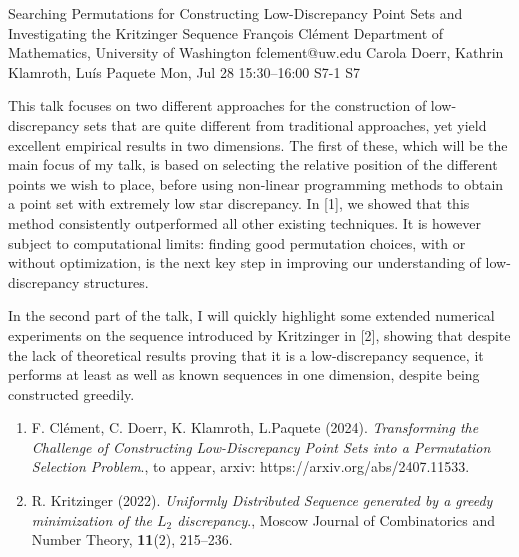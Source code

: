 \documentclass[12pt,lettersize,oneside]{book} %
\begin{document}
\begin{talk}
  {Searching Permutations for Constructing Low-Discrepancy Point Sets and Investigating the Kritzinger Sequence}%
  {Fran\c{c}ois Cl\'{e}ment}%
  {Department of Mathematics, University of Washington}%
  {fclement@uw.edu}%
  {Carola Doerr, Kathrin Klamroth, Lu\'is Paquete}%
  {}%
  {Mon, Jul 28 15:30--16:00}%
  {S7-1}%
  {S7}%
  
    
   
This talk focuses on two different approaches for the construction of low-discrepancy sets that are quite different from traditional approaches, yet yield excellent empirical results in two dimensions. The first of these, which will be the main focus of my talk, is based on selecting the relative position of the different points we wish to place, before using non-linear programming methods to obtain a point set with extremely low star discrepancy. In [1], we showed that this method consistently outperformed all other existing techniques. It is however subject to computational limits: finding good permutation choices, with or without optimization, is the next key step in improving our understanding of low-discrepancy structures.

In the second part of the talk, I will quickly highlight some extended numerical experiments on the sequence introduced by Kritzinger in [2], showing that despite the lack of theoretical results proving that it is a low-discrepancy sequence, it performs at least as well as known sequences in one dimension, despite being constructed greedily. 

\medskip

\begin{enumerate}
 \item[{[1]}] F. Cl\'ement, C. Doerr, K. Klamroth, L.Paquete (2024). {\it Transforming the Challenge of Constructing Low-Discrepancy Point Sets into a Permutation Selection Problem}., to appear, arxiv: https://arxiv.org/abs/2407.11533.
 \item[{[2]}] R. Kritzinger (2022).  {\it Uniformly Distributed Sequence generated by a greedy minimization of the $L_2$ discrepancy}., Moscow Journal of Combinatorics and Number Theory, \textbf{11}(2), 215--236.
\end{enumerate}

\end{talk}
\end{document}
